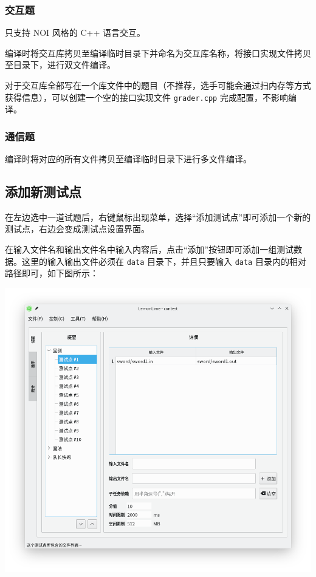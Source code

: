\documentclass[UTF-8]{ctexart}
\begin{document}
			\subsubsection{交互题}

				只支持 NOI 风格的 C++ 语言交互。

				编译时将交互库拷贝至编译临时目录下并命名为交互库名称，将接口实现文件拷贝至目录下，进行双文件编译。

				对于交互库全部写在一个库文件中的题目（不推荐，选手可能会通过扫内存等方式获得信息），可以创建一个空的接口实现文件 \texttt{grader.cpp} 完成配置，不影响编译。

			\subsubsection{通信题}

				编译时将对应的所有文件拷贝至编译临时目录下进行多文件编译。

		\subsection{添加新测试点}

			在左边选中一道试题后，右键鼠标出现菜单，选择“添加测试点”即可添加一个新的测试点，右边会变成测试点设置界面。

			在输入文件名和输出文件名中输入内容后，点击“添加”按钮即可添加一组测试数据。这里的输入输出文件必须在 \texttt{data} 目录下，并且只要输入 \texttt{data} 目录内的相对路径即可，如下图所示：

			\begin{center}
			\includegraphics[scale=0.5]{pics/edittestcase.png}
			\end{center}
\end{document}
